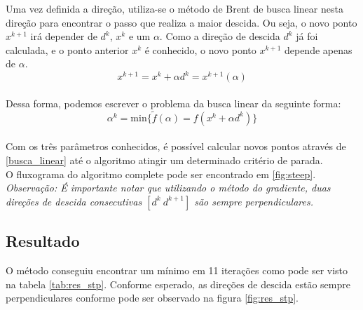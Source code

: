 \documentclass[a4paper,12pt,utf8x,notitlepage]{article}
\begin{document}
Uma vez definida a direção, utiliza-se o método de Brent de busca linear nesta direção para encontrar o passo que realiza a maior descida. Ou seja, o novo ponto $x^{k+1}$ irá depender de $d^k$, $x^k$ e um $\alpha$. Como a direção de descida $d^k$ já foi calculada, e o ponto anterior $x^k$ é conhecido, o novo ponto $x^{k+1}$ depende apenas de $\alpha$.\\

\begin{equation}
\label{busca_linear}
x^{k+1} = x^k+\alpha d^k = x^{k+1}(\alpha)
\end{equation}\\

Dessa forma, podemos escrever o problema da busca linear da seguinte forma:\\

\begin{equation}
\alpha^k = \text{min} \{\tilde{f}(\alpha) = f(x^k+\alpha d^k)\}
\end{equation}\\

Com os três parâmetros conhecidos, é possível calcular novos pontos através de \ref{busca_linear} até o algoritmo atingir um determinado critério de parada.\\

O fluxograma do algoritmo complete pode ser encontrado em \ref{fig:steep}.\\

\emph{Observação: É importante notar que utilizando o método do gradiente, duas direções de descida consecutivas $[d^k\ d^{k+1}]$
são sempre perpendiculares.}\\

\subsection{Resultado}

O método conseguiu encontrar um mínimo em 11 iterações como pode ser visto na tabela \ref{tab:res_stp}. Conforme esperado, as direções de descida estão sempre perpendiculares conforme pode ser observado na figura \ref{fig:res_stp}.
\end{document}
